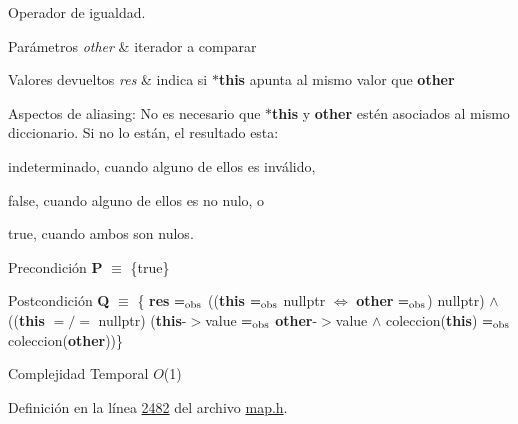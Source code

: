 Operador de igualdad. 


\begin{DoxyParams}{Parámetros}
{\em other} & iterador a comparar \\
\hline
\end{DoxyParams}

\begin{DoxyRetVals}{Valores devueltos}
{\em res} & indica si {\bfseries $\ast$this} apunta al mismo valor que {\bfseries other}\\
\hline
\end{DoxyRetVals}
\begin{DoxyParagraph}{Aspectos de aliasing\-:}
No es necesario que {\bfseries $\ast$this} y {\bfseries other} estén asociados al mismo diccionario. Si no lo están, el resultado esta\-:
\begin{DoxyItemize}
\item indeterminado, cuando alguno de ellos es inválido,
\item false, cuando alguno de ellos es no nulo, o
\item true, cuando ambos son nulos.
\end{DoxyItemize}
\end{DoxyParagraph}
\begin{DoxyPrecond}{Precondición}
{\bfseries P} $\equiv$ \{true\} 
\end{DoxyPrecond}
\begin{DoxyPostcond}{Postcondición}
{\bfseries Q} $\equiv$ \{ {\bfseries res} $=_{\rm obs}$ (({\bfseries this} $=_{\rm obs}$ nullptr $\Leftrightarrow$ {\bfseries other} $=_{\rm obs}$) nullptr) $\land$ (({\bfseries this} $=/=$ nullptr)  ({\bfseries this}-\/$>$value $=_{\rm obs}$ {\bfseries other}-\/$>$value $\land$ coleccion({\bfseries this}) $=_{\rm obs}$ coleccion({\bfseries other}))\}
\end{DoxyPostcond}

\begin{DoxyDescription}
\item[Complejidad Temporal]$O$(1)
\end{DoxyDescription}

Definición en la línea \hyperlink{map_8h_source_l02482}{2482} del archivo \hyperlink{map_8h_source}{map.\-h}.

